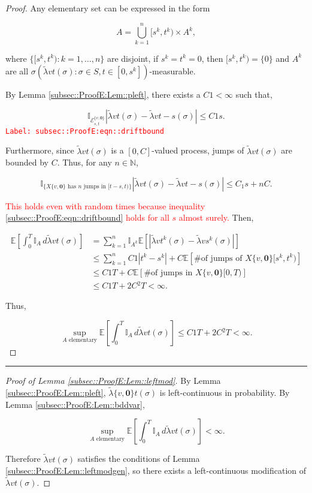 \documentclass[12pt]{article}
\newcommand{\mb}{\mathbb}
\newcommand{\mc}{\mathcal}
\newcommand{\te}{\text}
\newcommand{\tr}{\textcolor{red}}
\newcommand{\labe}[1]{\tr{\texttt{Label: #1}}}
\newcommand{\lin}{\rule{\linewidth}{0.4 pt}}
\newcommand{\ex}[1]{\mb{E}\left[#1\right]}			%
\renewcommand{\root}{\mathbf{0}}				%
\renewcommand{\v}{v}							%
\renewcommand{\S}{S}							%
\newcommand{\s}{\sigma}							%
\newcommand{\T}{T}								%
\renewcommand{\t}{t}							%
\renewcommand{\tt}{s}							%
\newcommand{\X}{X}								%
\newcommand{\const}{C}							%
\newcommand{\sln}[1]{^{#1}}						%
\newcommand{\alt}[1]{\widetilde{#1}}			%
\renewcommand{\it}{k}							%
\newcommand{\evnt}{\mc{E}}						%
\newcommand{\typset}{A}							%
\newcommand{\crate}{\alt{\lambda}}				%
\begin{document}
\begin{proof}
Any elementary set can be expressed in the form

\[\typset = \bigcup_{\it = 1}^n [\tt^\it,\t^\it)\times \typset\sln{\it},\]

where \(\{[\tt^\it,\t^\it):\it=1,\dots,n\}\) are disjoint, if \(\tt^\it = \t^\it = 0\), then \([\tt^\it,\t^\it) = \{0\}\) and \(\typset\sln{\it}\) are all \(\sigma(\crate{\v}{\t}(\s):\s \in \S,\t\in [0,\tt^\it])\)-measurable. 

By Lemma \ref{subsec::ProofE:Lem::pleft}, there exists a \(\const{1} < \infty\) such that,

\begin{equation}
\mb{I}_{\evnt^{\{\v,\root\}}_{\tt,\t}}|\crate{\v}{\t}(\s) - \crate{\v}{\t-\tt}(\s)| \leq \const{1}\tt.
\label{subsec::ProofE:eqn::driftbound}
\end{equation}
\labe{subsec::ProofE:eqn::driftbound}

Furthermore, since \(\crate{\v}{\t}(\s)\) is a \([0,\const{}]\)-valued process, jumps of \(\crate{\v}{\t}(\s)\) are bounded by \(\const{}\). Thus, for any \(n \in \mb{N}\),

\[\mb{I}_{\{\X{\{\v,\root\}}{}\te{ has }n\te{ jumps in } [\t-\tt,\t)\}}|\crate{\v}{\t}(\s) - \crate{\v}{\t-\tt}(\s)|\leq C_1\tt + n \const{}.\]

\tr{This holds even with random times because inequality \eqref{subsec::ProofE:eqn::driftbound} holds for all \(\tt\) almost surely.} Then,

\begin{align*}
\ex{\int_0^\T \mb{I}_\typset\,d\crate{\v}{\t}(\s)} &= \sum_{\it = 1}^n \mb{I}_{\typset^\it}\ex{\left|\crate{\v}{\t^k}(\s) - \crate{\v}{\tt^k}(\s)\right|}\\
&\leq \sum_{\it=1}^n \const{1}|\t^\it - \tt^\it| + \const{}\ex{\te{\# of jumps of }\X{\{\v,\root\}}{[\tt^\it,\t^\it)}}\\
&\leq \const{1}\T + \const{}\ex{\te{\# of jumps in }\X{\{\v,\root\}}{[0,\T)}}\\
&\leq \const{1}\T + 2\const{}^2\T < \infty.
\end{align*}

Thus,

\[\sup_{\typset\te{ elementary}} \ex{\int_0^\T \mb{I}_\typset\,d\crate{\v}{\t}(\s)} \leq \const{1}\T + 2\const{}^2\T < \infty.\]
\end{proof}

\lin

\begin{proof}[Proof of Lemma \ref{subsec::ProofE:Lem::leftmod}]

By Lemma \ref{subsec::ProofE:Lem::pleft}, \(\crate{\{\v,\root\}}{\t}(\s)\) is left-continuous in probability. By Lemma \ref{subsec::ProofE:Lem::bddvar},

\[\sup_{\typset\te{ elementary}} \ex{\int_0^\T \mb{I}_{\typset}\,d\crate{\v}{\t}(\s)} < \infty.\]

Therefore \(\crate{\v}{\t}(\s)\) satisfies the conditions of Lemma \ref{subsec::ProofE:Lem::leftmodgen}, so there exists a left-continuous modification of \(\crate{\v}{\t}(\s)\).
\end{proof}
\end{document}
